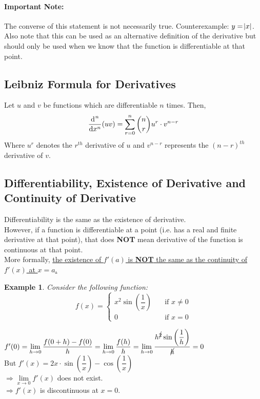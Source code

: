 \documentclass[14]{article}
\newtheorem*{ex}{Example}
\theoremstyle{definition}
\begin{document}
\paragraph{Important Note:}The converse of this statement is not necessarily true. Counterexample: $y = \abs{x}$.
Also note that this can be used as an alternative definition of the derivative but should only be used when we know that the function is differentiable at that point.
\subsection{Leibniz Formula for Derivatives}
Let $u$ and $v$ be functions which are differentiable $n$ times. Then,\\
\[
\dfrac{\dif^{\;n}}{\dif x^n} (uv) = \sum\limits_{r=0}^{n} {n \choose r} u^r \cdot v^{n - r}
\]
Where $u^r$ denotes the $r^{th}$ derivative of $u$ and $v^{n-r}$ represents the $(n-r)^{th}$ derivative of $v$.
\subsection{Differentiability, Existence of Derivative and Continuity of Derivative}
Differentiability is the same as the existence of derivative.\\
However, if a function is differentiable at a point (i.e. has a real and finite derivative at that point), that does \textbf{NOT} mean derivative of the function is continuous at that point.\\
More formally, \underline{the existence of $f'(a)$ is \textbf{NOT} the same as the continuity of $f'(x)$ at $x = a$.}
\begin{ex}
Consider the following function:
\[
f(x) = \left\{
        \begin{array}{ll}
            x^2 \sin\left(\dfrac{1}{x}\right) & \quad \text{if } x \neq 0\\
            0 & \quad \text{if } x = 0 
        \end{array}
    \right.
\]
\end{ex}
$f'(0) = \lim\limits_{h \to 0} \dfrac{f(0+h) - f(0)}{h} = \lim\limits_{h \to 0} \dfrac{f(h)}{h} = \lim\limits_{h \to 0} \dfrac{h^{\cancel{2}} \sin\left(\dfrac{1}{h}\right)}{\cancel{h}} = 0$\\
But $f'(x) = 2x\cdot \sin\left(\dfrac{1}{x}\right) - \cos\left(\dfrac{1}{x}\right)\;$\\
$\Rightarrow \lim\limits_{x \to 0} f'(x)$ does not exist.\\
$\Rightarrow f'(x)$ is discontinuous at $x = 0$.
\pagebreak
\end{document}
